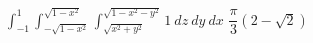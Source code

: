 {$\int_{-1}^{1} \int_{-\sqrt{1-x^2}}^{\sqrt{1-x^2}} \int_{\sqrt{x^2 + y^2}}^{\sqrt{1-x^2-y^2}} 1 \: dz \: dy \: dx$ 
}
{$\dfrac{\pi}{3}\left( 2-\sqrt{2} \right)$}
